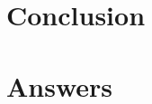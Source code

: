 \documentclass{beamer}
\begin{document}
%
%
%
%

\section{Conclusion}

\section{Answers}
\end{document}
